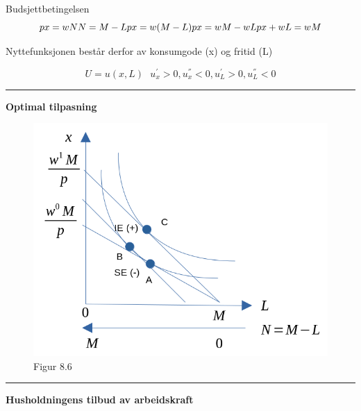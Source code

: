 \documentclass[
  letterpaper,
  DIV=11,
  numbers=noendperiod]{scrartcl}
\begin{document}
Budsjettbetingelsen \begin{equation*}
px = wN\\
N = M-L \\
px = w(M-L) \\
px =wM -wL \\
px+wL = wM  
\end{equation*}

Nyttefunksjonen består derfor av konsumgode (x) og fritid (L)

\begin{equation*}
U=u(x,L) \text{ } u^{'}_{x} >0, u^{''}_{x} <0, u^{'}_{L} >0, u^{''}_{L} <0
\end{equation*}

\begin{center}\rule{0.5\linewidth}{0.5pt}\end{center}

\textbf{Optimal tilpasning}

\begin{figure}[H]

{\centering \includegraphics[width=1\textwidth,height=\textheight]{drawio/utltilbud.png}

}

\caption{Figur 8.6}

\end{figure}%

\begin{center}\rule{0.5\linewidth}{0.5pt}\end{center}

\textbf{Husholdningens tilbud av arbeidskraft}
\end{document}
